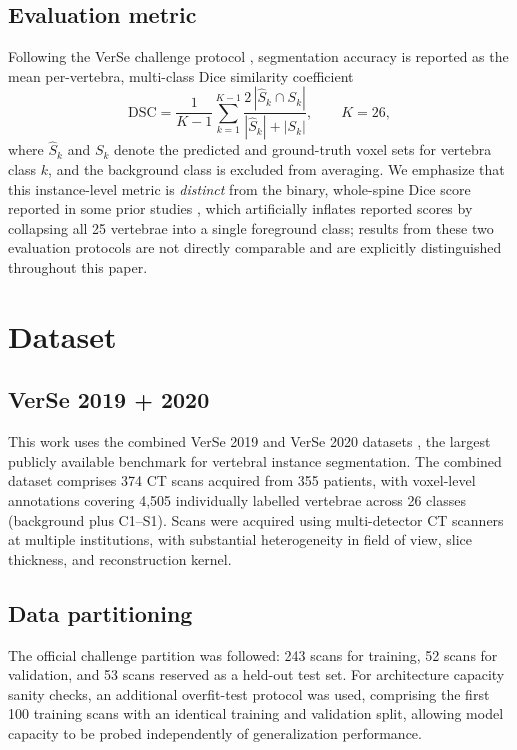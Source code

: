 \documentclass[preprint,12pt,3p]{elsarticle}
\begin{document}
\subsection{Evaluation metric}
Following the VerSe challenge protocol \cite{sekuboyina2022}, segmentation accuracy is reported as the mean per-vertebra, multi-class Dice similarity coefficient
\begin{equation}
\mathrm{DSC} = \frac{1}{K-1} \sum_{k=1}^{K-1} \frac{2\,|\hat{S}_k \cap S_k|}{|\hat{S}_k| + |S_k|}, \qquad K = 26,
\label{eq:dsc}
\end{equation}
where $\hat{S}_k$ and $S_k$ denote the predicted and ground-truth voxel sets for vertebra class $k$, and the background class is excluded from averaging. We emphasize that this instance-level metric is \emph{distinct} from the binary, whole-spine Dice score reported in some prior studies \cite{ssae2022,alhamouri2025}, which artificially inflates reported scores by collapsing all 25 vertebrae into a single foreground class; results from these two evaluation protocols are not directly comparable and are explicitly distinguished throughout this paper.

\section{Dataset}
\label{sec:dataset}

\subsection{VerSe 2019 + 2020}
This work uses the combined VerSe 2019 and VerSe 2020 datasets \cite{sekuboyina2022}, the largest publicly available benchmark for vertebral instance segmentation. The combined dataset comprises 374 CT scans acquired from 355 patients, with voxel-level annotations covering 4{,}505 individually labelled vertebrae across 26 classes (background plus C1--S1). Scans were acquired using multi-detector CT scanners at multiple institutions, with substantial heterogeneity in field of view, slice thickness, and reconstruction kernel.

\subsection{Data partitioning}
The official challenge partition was followed: 243 scans for training, 52 scans for validation, and 53 scans reserved as a held-out test set. For architecture capacity sanity checks, an additional overfit-test protocol was used, comprising the first 100 training scans with an identical training and validation split, allowing model capacity to be probed independently of generalization performance.
\end{document}
